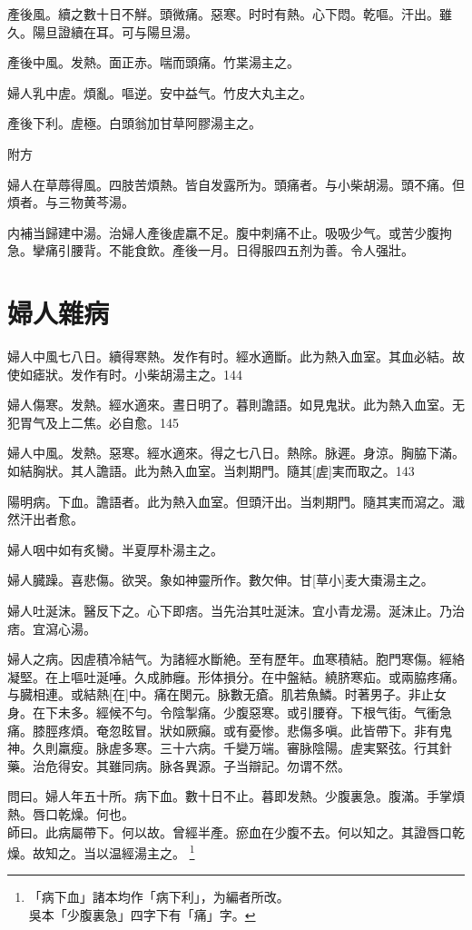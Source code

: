 \documentclass[12pt,twoside,UTF8,b5paper]{ctexbook}
\begin{document}
產後風。續之數十日不觧。頭微痛。惡寒。时时有熱。心下悶。乾嘔。汗出。雖久。陽旦證續在耳。可与陽旦湯。

產後中風。发熱。面正赤。喘而頭痛。竹枼湯主之。

婦人乳中虗。煩亂。嘔逆。安中益气。竹皮大丸主之。

產後下利。虗極。白頭翁加甘草阿膠湯主之。

附方

婦人在草蓐得風。四肢苦煩熱。皆自发露所为。頭痛者。与小柴胡湯。頭不痛。但煩者。与三物黄芩湯。

内補当歸建中湯。治婦人產後虗羸不足。腹中刺痛不止。吸吸少气。或苦少腹拘急。攣痛引腰背。不能食飲。產後一月。日得服四五剂为善。令人强壯。

\chapter{婦人雜病}

婦人中風七八日。續得寒熱。发作有时。經水適斷。此为熱入血室。其血必結。故使如瘧狀。发作有时。小柴胡湯主之。144

婦人傷寒。发熱。經水適來。晝日明了。暮則譫語。如見鬼狀。此为熱入血室。无犯胃气及上二焦。必自愈。145

婦人中風。发熱。惡寒。經水適來。得之七八日。熱除。脉遲。身涼。胸脇下滿。如結胸狀。其人譫語。此为熱入血室。当刺期門。隨其[虗]実而取之。143

陽明病。下血。譫語者。此为熱入血室。但頭汗出。当刺期門。隨其実而瀉之。濈然汗出者愈。

婦人咽中如有炙臠。半夏厚朴湯主之。

婦人臓躁。喜悲傷。欲哭。象如神靈所作。數欠伸。甘[草小]麦大棗湯主之。

婦人吐涎沫。醫反下之。心下即痞。当先治其吐涎沫。宜小青龙湯。涎沫止。乃治痞。宜瀉心湯。

婦人之病。因虗積冷結气。为諸經水斷絶。至有歷年。血寒積結。胞門寒傷。經絡凝堅。在上嘔吐涎唾。久成肺癰。形体損分。在中盤結。繞脐寒疝。或兩脇疼痛。与臓相連。或結熱[在]中。痛在関元。脉數无瘡。肌若魚鱗。时著男子。非止女身。在下未多。經候不勻。令陰掣痛。少腹惡寒。或引腰脊。下根气街。气衝急痛。膝脛疼煩。奄忽眩冒。狀如厥癲。或有憂惨。悲傷多嗔。此皆帶下。非有鬼神。久則羸瘦。脉虗多寒。三十六病。千變万端。審脉陰陽。虗実緊弦。行其針藥。治危得安。其雖同病。脉各異源。子当辯記。勿谓不然。

問曰。婦人年五十所。病下血。數十日不止。暮即发熱。少腹裏急。腹滿。手掌煩熱。唇口乾燥。何也。\\
師曰。此病屬帶下。何以故。曾經半產。瘀血在少腹不去。何以知之。其證唇口乾燥。故知之。当以温經湯主之。
	\footnote{「病下血」諸本均作「病下利」，为編者所改。\\吳本「少腹裏急」四字下有「痛」字。}
\end{document}
